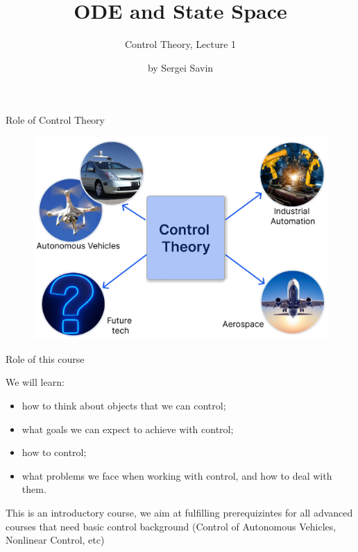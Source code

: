 \documentclass{beamer}
\title{ODE and State Space}
\subtitle{Control Theory, Lecture 1}
\author{by Sergei Savin}
\date{\mydate}
\begin{document}
\maketitle





\begin{frame}{Role of Control Theory}
	\begin{flushleft}
		
		\begin{figure}
			\centering
			\includegraphics[width=1.00\linewidth]{"Control Examples"}

			\label{fig:control-examples}
		\end{figure}
		
		
	\end{flushleft}
\end{frame}


\begin{frame}{Role of this course}
	\begin{flushleft}
		
		We will learn:
		
		\begin{itemize}
			\item how to think about objects that we can control;
			
			\item what goals we can expect to achieve with control;
			
			\item how to control;
			
			\item what problems we face when working with control, and how to deal with them.
		\end{itemize}
		
		\bigskip
		
		This is an introductory course, we aim at fulfilling prerequizintes for all advanced courses that need basic control background (Control of Autonomous Vehicles, Nonlinear Control, etc)
		
	\end{flushleft}
\end{frame}
\end{document}
